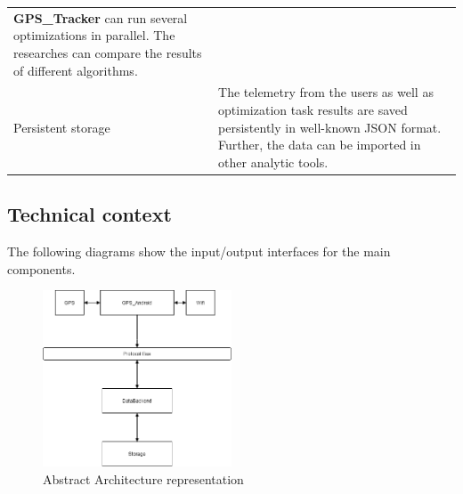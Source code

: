 \begin{longtable}[]{@{}ll@{}}
\begin{minipage}[t]{0.63\columnwidth}
\textbf{GPS\_Tracker} can run several optimizations in parallel. The
researches can compare the results of different algorithms.\strut
\end{minipage}\tabularnewline
\begin{minipage}[t]{0.31\columnwidth}\raggedright
Persistent storage\strut
\end{minipage} & \begin{minipage}[t]{0.63\columnwidth}\raggedright
The telemetry from the users as well as optimization task results are
saved persistently in well-known JSON format. Further, the data can be
imported in other analytic tools.\strut
\end{minipage}\tabularnewline
\bottomrule
\end{longtable}

\hypertarget{technical-context}{%
\subsection{Technical context}\label{technical-context}}

The following diagrams show the input/output interfaces for the main
components.

\begin{figure}
\centering
\includegraphics[width=0.5\textwidth,height=\textheight]{schemes/architecture/ArchitectureDiagram.png}
\caption{Abstract Architecture representation}
\end{figure}
